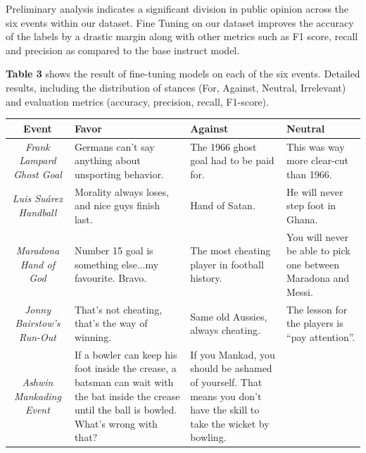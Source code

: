 \documentclass[sigconf, review]{acmart}
\begin{document}
Preliminary analysis indicates a significant division in public opinion across the six events within our dataset. 
Fine Tuning on our dataset improves the accuracy of the labels by a drastic margin along with other metrics such as F1 score, recall and precision as compared to the base instruct model.

\textbf{Table 3} shows the result of fine-tuning models on each of the six events.
Detailed results, including the distribution of stances (For, Against, Neutral, Irrelevant) and evaluation metrics (accuracy, precision, recall, F1-score).

\begin{table}[!htbp]
    \centering
    { %
      \renewcommand{\arraystretch}{1.2}%
      \setlength{\tabcolsep}{4pt}%
      \begin{tabular}{|c|p{4cm}|p{4cm}|p{4cm}|}
          \hline
          \textbf{Event} & \textbf{Favor} & \textbf{Against} & \textbf{Neutral} \\
          \hline
          {\textit{Frank Lampard Ghost Goal}} 
           & Germans can't say anything about unsporting behavior.  
           & The 1966 ghost goal had to be paid for. 
           & This was way more clear-cut than 1966. \\
          \hline
          {\textit{Luis Suárez Handball}} 
           & Morality always loses, and nice guys finish last.  
           & Hand of Satan. 
           & He will never step foot in Ghana. \\
          \hline
          {\textit{Maradona Hand of God}} 
           & Number 15 goal is something else...my favourite. Bravo. 
           & The most cheating player in football history. 
           & You will never be able to pick one between Maradona and Messi. \\
          \hline
          {\textit{Jonny Bairstow's Run-Out}} 
           & That’s not cheating, that’s the way of winning. 
           & Same old Aussies, always cheating. 
           & The lesson for the players is ``pay attention''. \\
          \hline
          {\textit{Ashwin Mankading Event}} 
           & If a bowler can keep his foot inside the crease, a batsman can wait with the bat inside the crease until the ball is bowled. What's wrong with that? 
           & If you Mankad, you should be ashamed of yourself. That means you don't have the skill to take the wicket by bowling. 

\end{tabular}}
\end{table}
\end{document}
